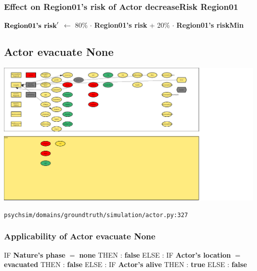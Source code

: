 \documentclass{article}%
\begin{document}
%
\subsubsection{Effect on Region01's risk of Actor decreaseRisk Region01}%
\label{ssubsec:Effect on Region01's risk of Actor decreaseRisk Region01}%
\begin{flushleft}%
$\mbox{\textbf{Region01's risk}} '$%
$\leftarrow$%
80\%%
$\cdot$%
\textbf{Region01's risk}%
+%
20\%%
$\cdot$%
\textbf{Region01's riskMin}%
\end{flushleft}

%
\subsection{Actor evacuate None}%
\label{subsec:Actor evacuate None}%
\includegraphics[width=\textwidth]{images/Actor-evacuate.png}%
\begin{flushleft}%
\verb|psychsim/domains/groundtruth/simulation/actor.py:327|%
\end{flushleft}%
\subsubsection{Applicability of Actor evacuate None}%
\label{ssubsec:Applicability of Actor evacuate None}%
\begin{flushleft}%
IF %
\textbf{Nature's phase}%
$=$%
\textbf{none}%
\linebreak%
\hspace*{2em}%
THEN %
: %
\textbf{false}%
\linebreak%
\hspace*{2em}%
ELSE %
: %
IF %
\textbf{Actor's location}%
$=$%
\textbf{evacuated}%
\linebreak%
\hspace*{4em}%
THEN %
: %
\textbf{false}%
\linebreak%
\hspace*{4em}%
ELSE %
: %
IF %
\textbf{Actor's alive}%
\linebreak%
\hspace*{6em}%
THEN %
: %
\textbf{true}%
\linebreak%
\hspace*{6em}%
ELSE %
: %
\textbf{false}%
\end{flushleft}
\end{document}

